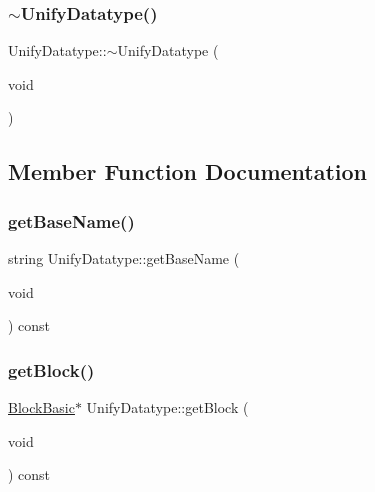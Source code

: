 \mbox{\label{class_unify_datatype_abe7f79c3d4c417d205212b4c807d9b4c}} 
\subsubsection{\texorpdfstring{$\sim$UnifyDatatype()}{~UnifyDatatype()}}
{\footnotesize\ttfamily Unify\+Datatype\+::$\sim$\+Unify\+Datatype (\begin{DoxyParamCaption}\item[{void}]{ }\end{DoxyParamCaption})}



\subsection{Member Function Documentation}
\mbox{\label{class_unify_datatype_a692348439ddb73f8c826bf687ac8aa9a}} 
\subsubsection{\texorpdfstring{getBaseName()}{getBaseName()}}
{\footnotesize\ttfamily string Unify\+Datatype\+::get\+Base\+Name (\begin{DoxyParamCaption}\item[{void}]{ }\end{DoxyParamCaption}) const}

\mbox{\label{class_unify_datatype_a91c838e12c5d01f8d02637c9087aeb5a}} 
\subsubsection{\texorpdfstring{getBlock()}{getBlock()}}
{\footnotesize\ttfamily \mbox{\hyperlink{class_block_basic}{Block\+Basic}}$\ast$ Unify\+Datatype\+::get\+Block (\begin{DoxyParamCaption}\item[{void}]{ }\end{DoxyParamCaption}) const\hspace{0.3cm}{\ttfamily [inline]}}



